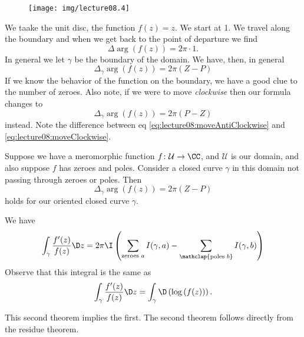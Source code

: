 \begin{wrapfigure}[5]{r}{0.75in}
\vspace{-30pt}
\begin{center}
\texttt{[image: img/lecture08.4]}
\end{center}
\end{wrapfigure}
We taake the unit disc, the function $f(z)=z$. We start at 1. We
travel along the boundary and when we get back to the point of
departure we find
\begin{equation}
\Delta\arg(f(z))=2\pi\cdot1.
\end{equation}
In general we let $\gamma$ be the boundary of the domain. We
have, then, in general
\begin{equation}\label{eq:lecture08:moveAntiClockwise}
\Delta_{\gamma}\arg(f(z))=2\pi(Z-P)
\end{equation}
If we know the behavior of the function on the boundary, we have
a good clue to the number of zeroes. Also note, if we were to move
\emph{clockwise} then our formula changes to
\begin{equation}\label{eq:lecture08:moveClockwise}
\Delta_{\gamma}\arg(f(z))=2\pi(P-Z)
\end{equation}
instead. Note the difference between eq
\eqref{eq:lecture08:moveAntiClockwise} and
\eqref{eq:lecture08:moveClockwise}. 

\begin{thm}
Suppose we have a meromorphic function
$f\colon\mathcal{U}\to\CC$, and $\mathcal{U}$ is our domain, and
also suppose $f$ has zeroes and poles. Consider a closed curve $\gamma$ in
this domain not passing through zeroes or poles. Then
\begin{equation}
\Delta_{\gamma}\arg(f(z))=2\pi(Z-P)
\end{equation}
holds for our oriented closed curve $\gamma$.
\end{thm}
\begin{thm}
We have
\begin{equation}
\int_{\gamma}\frac{f'(z)}{f(z)}\D z=2\pi\I\left(
\sum_{{\text{zeroes }a}}I(\gamma,a)-\sum_{\mathclap{\text{poles }b}}I(\gamma,b)
\right)
\end{equation}
Observe that this integral is the same as
\begin{equation}
\int_{\gamma}\frac{f'(z)}{f(z)}\D z=\int_{\gamma}\D\left(\log\left(f(z)\right)\right).
\end{equation}
\end{thm}
\begin{rmk}
This second theorem implies the first. The second theorem follows
directly from the residue theorem.
\end{rmk}
